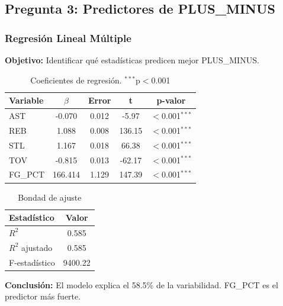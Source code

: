 \subsection{Pregunta 3: Predictores de PLUS\_MINUS}

\subsubsection{Regresión Lineal Múltiple}

\textbf{Objetivo:} Identificar qué estadísticas predicen mejor PLUS\_MINUS.

\begin{table}[H]
\centering
\begin{tabular}{|l|c|c|c|c|}
\hline
\textbf{Variable} & \textbf{$\beta$} & \textbf{Error} & \textbf{t} & \textbf{p-valor} \\
\hline
AST & -0.070 & 0.012 & -5.97 & $<$0.001$^{***}$ \\
REB & 1.088 & 0.008 & 136.15 & $<$0.001$^{***}$ \\
STL & 1.167 & 0.018 & 66.38 & $<$0.001$^{***}$ \\
TOV & -0.815 & 0.013 & -62.17 & $<$0.001$^{***}$ \\
FG\_PCT & 166.414 & 1.129 & 147.39 & $<$0.001$^{***}$ \\
\hline
\end{tabular}
\caption{Coeficientes de regresión. $^{***}$p$<$0.001}
\end{table}

\begin{table}[H]
\centering
\begin{tabular}{|l|c|}
\hline
\textbf{Estadístico} & \textbf{Valor} \\
\hline
$R^2$ & 0.585 \\
$R^2$ ajustado & 0.585 \\
F-estadístico & 9400.22 \\
\hline
\end{tabular}
\caption{Bondad de ajuste}
\end{table}

\textbf{Conclusión:} El modelo explica el 58.5\% de la variabilidad. FG\_PCT es el predictor más fuerte.

